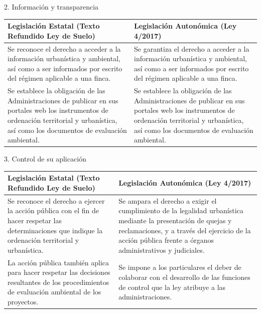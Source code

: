 \documentclass[10pt, aspectratio=169]{beamer}
\begin{document}
\begin{frame}{2. Información y transparencia}
    \begin{tabularx}{\textwidth}{@{}X X@{}}
        \toprule
        \textbf{Legislación Estatal (Texto Refundido Ley de Suelo)} & \textbf{Legislación Autonómica (Ley 4/2017)} \\
        \midrule
        Se reconoce el derecho a acceder a la información urbanística y ambiental, así como a ser informados por escrito del régimen aplicable a una finca. & Se garantiza el derecho a acceder a la información urbanística y ambiental, así como a ser informados por escrito del régimen aplicable a una finca. \\
        \midrule
        Se establece la obligación de las Administraciones de publicar en sus portales web los instrumentos de ordenación territorial y urbanística, así como los documentos de evaluación ambiental. & Se establece la obligación de las Administraciones de publicar en sus portales web los instrumentos de ordenación territorial y urbanística, así como los documentos de evaluación ambiental. \\
        \bottomrule
    \end{tabularx}
\end{frame}

\begin{frame}{3. Control de su aplicación}
    \begin{tabularx}{\textwidth}{@{}X X@{}}
        \toprule
        \textbf{Legislación Estatal (Texto Refundido Ley de Suelo)} & \textbf{Legislación Autonómica (Ley 4/2017)} \\
        \midrule
        Se reconoce el derecho a ejercer la acción pública con el fin de hacer respetar las determinaciones que indique la ordenación territorial y urbanística. & Se ampara el derecho a exigir el cumplimiento de la legalidad urbanística mediante la presentación de quejas y reclamaciones, y a través del ejercicio de la acción pública frente a órganos administrativos y judiciales. \\
        \midrule
        La acción pública también aplica para hacer respetar las decisiones resultantes de los procedimientos de evaluación ambiental de los proyectos. & Se impone a los particulares el deber de colaborar con el desarrollo de las funciones de control que la ley atribuye a las administraciones. \\
        \bottomrule
    \end{tabularx}
\end{frame}
\end{document}
